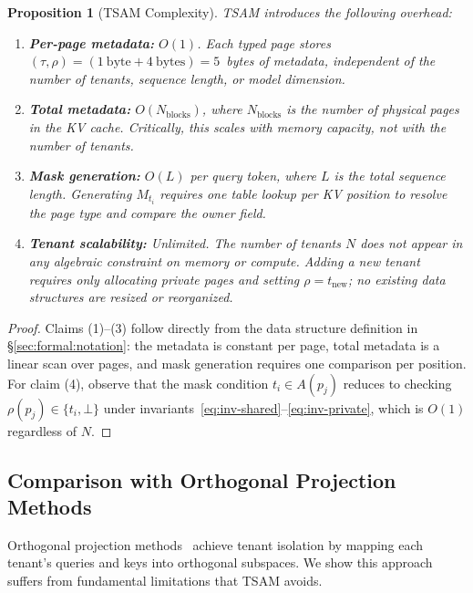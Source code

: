 \documentclass[11pt]{article}
\newtheorem{proposition}[theorem]{Proposition}
\begin{document}
\begin{proposition}[TSAM Complexity]
\label{prop:complexity}
TSAM introduces the following overhead:
\begin{enumerate}[leftmargin=1.5em,itemsep=2pt]
    \item \textbf{Per-page metadata:} $O(1)$. Each typed page stores
          $(\tau, \rho) = (1~\text{byte} + 4~\text{bytes}) = 5$~bytes of metadata,
          independent of the number of tenants, sequence length, or model dimension.
    \item \textbf{Total metadata:} $O(N_{\mathrm{blocks}})$, where $N_{\mathrm{blocks}}$
          is the number of physical pages in the KV cache. Critically, this scales with
          \emph{memory capacity}, not with the number of tenants.
    \item \textbf{Mask generation:} $O(L)$ per query token, where $L$ is the total
          sequence length. Generating $M_{t_i}$ requires one table lookup per KV position
          to resolve the page type and compare the owner field.
    \item \textbf{Tenant scalability:} \emph{Unlimited}. The number of tenants $N$
          does not appear in any algebraic constraint on memory or compute. Adding a new
          tenant requires only allocating private pages and setting $\rho = t_{\mathrm{new}}$;
          no existing data structures are resized or reorganized.
\end{enumerate}
\end{proposition}

\begin{proof}
Claims (1)--(3) follow directly from the data structure definition in
\S\ref{sec:formal:notation}: the metadata is constant per page, total metadata is a linear
scan over pages, and mask generation requires one comparison per position. For claim (4),
observe that the mask condition $t_i \in A(p_j)$ reduces to checking $\rho(p_j) \in \{t_i, \bot\}$
under invariants~\eqref{eq:inv-shared}--\eqref{eq:inv-private}, which is $O(1)$ regardless
of $N$.
\end{proof}

\subsection{Comparison with Orthogonal Projection Methods}
\label{sec:formal:orthogonal}

Orthogonal projection methods~\cite{li2024orthogonal} achieve tenant isolation by mapping
each tenant's queries and keys into orthogonal subspaces. We show this approach suffers
from fundamental limitations that TSAM avoids.
\end{document}
